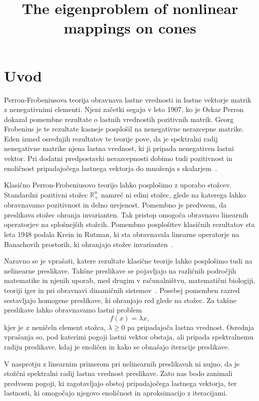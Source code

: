 \documentclass[mat2, tisk]{fmfdelo}
\title{The eigenproblem of nonlinear mappings on cones}
\newcommand{\R}{\mathbb{R}}
\begin{document}
\section{Uvod}
Perron-Frobeniusova teorija obravnava lastne vrednosti in lastne vektorje
matrik z nenegativnimi elementi. Njeni začetki segajo v leto 1907, ko je
Oskar Perron dokazal pomembne rezultate o lastnih vrednostih pozitivnih
matrik. Georg Frobenius je te rezultate kasneje posplošil na nenegativne
nerazcepne matrike. Eden izmed osrednjih rezultatov te teorije pove,
da je spektralni radij nenegativne matrike njena lastna vrednost, ki ji
pripada nenegativen lastni vektor. Pri dodatni predpostavki nerazcepnosti
dobimo tudi pozitivnost in enoličnost pripadajočega lastnega vektorja
do množenja s skalarjem~\cite{LemNuss}.

Klasično Perron-Frobeniusovo teorijo lahko posplošimo z uporabo stožcev.
Standardni pozitivni stožec $\R^n_+$ namreč ni edini stožec, glede na
katerega lahko obravnavamo pozitivnost in delno urejenost. Pomembno je
predvsem, da preslikava stožec ohranja invarianten. Tak pristop omogoča
obravnavo linearnih operatorjev na splošnejših stožcih. Pomembno
posplošitev klasičnih rezultatov sta leta 1948 podala Krein in Rutman,
ki sta obravnavala linearne operatorje na Banachovih prostorih, ki
ohranjajo stožec invarianten~\cite{KreinRuthman}.

Naravno se je vprašati, katere rezultate klasične teorije lahko
posplošimo tudi na nelinearne preslikave. Takšne preslikave se pojavljajo
na različnih področjih matematike in njenih uporab, med drugim
v računalništvu, matematični biologiji, teoriji iger in pri obravnavi
dinamičnih sistemov~\cite{LemNuss}. Posebej pomemben razred sestavljajo
homogene preslikave, ki ohranjajo red glede na stožec. Za takšne
preslikave lahko obravnavamo lastni problem
\[
f(x)=\lambda x,
\]
kjer je $x$ neničeln element stožca, $\lambda\geq0$ pa pripadajoča
lastna vrednost. Osrednja vprašanja so, pod katerimi pogoji lastni
vektor obstaja, ali pripada spektralnemu radiju preslikave, kdaj je
enoličen in kako se obnašajo iteracije preslikave.

V nasprotju z linearnim primerom pri nelinearnih preslikavah
ni nujno, da je stožčni spektralni radij lastna vrednost
preslikave. Zato nas bodo zanimali predvsem pogoji, ki
zagotavljajo obstoj pripadajočega lastnega vektorja,
ter lastnosti, ki omogočajo njegovo enoličnost in
aproksimacijo z iteracijami.
\end{document}

